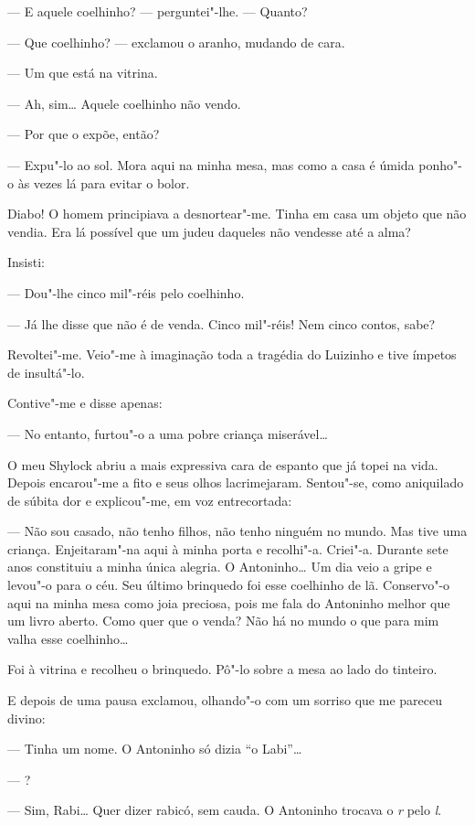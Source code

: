 --- E aquele coelhinho? --- perguntei"-lhe. --- Quanto?

--- Que coelhinho? --- exclamou o aranho, mudando de cara.

--- Um que está na vitrina.

--- Ah, sim\ldots{} Aquele coelhinho não vendo.

--- Por que o expõe, então?

--- Expu"-lo ao sol. Mora aqui na minha mesa, mas como a casa é úmida
ponho"-o às vezes lá para evitar o bolor.

Diabo! O homem principiava a desnortear"-me. Tinha em casa um objeto que
não vendia. Era lá possível que um judeu daqueles não vendesse até a
alma?

Insisti:

--- Dou"-lhe cinco mil"-réis pelo coelhinho.

--- Já lhe disse que não é de venda. Cinco mil"-réis! Nem cinco contos,
sabe?

Revoltei"-me. Veio"-me à imaginação toda a tragédia do Luizinho e tive
ímpetos de insultá"-lo.

Contive"-me e disse apenas:

--- No entanto, furtou"-o a uma pobre criança miserável\ldots{}

O meu Shylock abriu a mais expressiva cara de espanto que já topei na
vida. Depois encarou"-me a fito e seus olhos lacrimejaram. Sentou"-se,
como aniquilado de súbita dor e explicou"-me, em voz entrecortada:

--- Não sou casado, não tenho filhos, não tenho ninguém no mundo. Mas
tive uma criança. Enjeitaram"-na aqui à minha porta e recolhi"-a. Criei"-a.
Durante sete anos constituiu a minha única alegria. O Antoninho\ldots{} Um
dia veio a gripe e levou"-o para o céu. Seu último brinquedo foi esse
coelhinho de lã. Conservo"-o aqui na minha mesa como joia preciosa, pois
me fala do Antoninho melhor que um livro aberto. Como quer que o venda?
Não há no mundo o que para mim valha esse coelhinho\ldots{}

Foi à vitrina e recolheu o brinquedo. Pô"-lo sobre a mesa ao lado do
tinteiro.

E depois de uma pausa exclamou, olhando"-o com um sorriso que me pareceu
divino:

--- Tinha um nome. O Antoninho só dizia ``o Labi''\ldots{}

--- ?

--- Sim, Rabi\ldots{} Quer dizer rabicó, sem cauda. O Antoninho trocava o
\emph{r} pelo \emph{l}.

